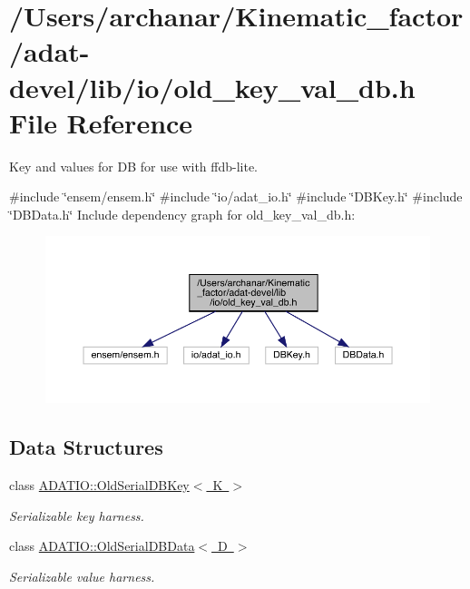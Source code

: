\hypertarget{adat-devel_2lib_2io_2old__key__val__db_8h}{}\section{/\+Users/archanar/\+Kinematic\+\_\+factor/adat-\/devel/lib/io/old\+\_\+key\+\_\+val\+\_\+db.h File Reference}
\label{adat-devel_2lib_2io_2old__key__val__db_8h}


Key and values for DB for use with ffdb-\/lite.  


{\ttfamily \#include \char`\"{}ensem/ensem.\+h\char`\"{}}\newline
{\ttfamily \#include \char`\"{}io/adat\+\_\+io.\+h\char`\"{}}\newline
{\ttfamily \#include \char`\"{}D\+B\+Key.\+h\char`\"{}}\newline
{\ttfamily \#include \char`\"{}D\+B\+Data.\+h\char`\"{}}\newline
Include dependency graph for old\+\_\+key\+\_\+val\+\_\+db.\+h\+:
\nopagebreak
\begin{figure}[H]
\begin{center}
\leavevmode
\includegraphics[width=350pt]{d2/d88/adat-devel_2lib_2io_2old__key__val__db_8h__incl}
\end{center}
\end{figure}
\subsection*{Data Structures}
\begin{DoxyCompactItemize}
\item 
class \mbox{\hyperlink{classADATIO_1_1OldSerialDBKey}{A\+D\+A\+T\+I\+O\+::\+Old\+Serial\+D\+B\+Key$<$ K $>$}}
\begin{DoxyCompactList}\small\item\em Serializable key harness. \end{DoxyCompactList}\item 
class \mbox{\hyperlink{classADATIO_1_1OldSerialDBData}{A\+D\+A\+T\+I\+O\+::\+Old\+Serial\+D\+B\+Data$<$ D $>$}}
\begin{DoxyCompactList}\small\item\em Serializable value harness. \end{DoxyCompactList}\end{DoxyCompactItemize}
